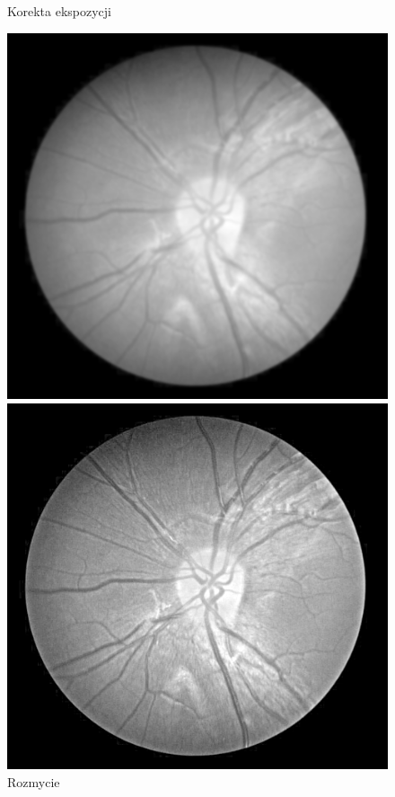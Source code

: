 \documentclass[polish,polish,a4paper]{article}
\begin{document}
\begin{figure}[!h]
\begin{minipage}{0.3\linewidth}
				\caption*{Korekta ekspozycji}
			\end{minipage}
			\begin{minipage}{0.3\linewidth}
				\includegraphics[width=\linewidth]{./dane/metoda1/blur.png}
				\caption*{Rozmycie}
			\end{minipage}
			\begin{minipage}{0.3\linewidth}
				\includegraphics[width=\linewidth]{./dane/metoda1/sharpen.png}

\end{minipage}
\end{figure}
\end{document}
